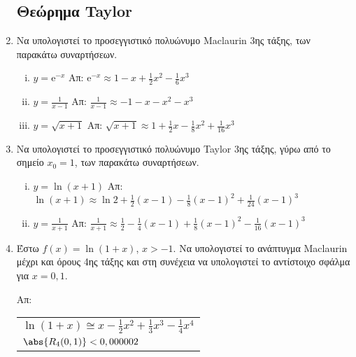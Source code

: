 \documentclass[a4paper,table]{report}
\begin{document}
\begin{enumerate}
      \subsection*{Θεώρημα Taylor}

    \item Να υπολογιστεί το προσεγγιστικό πολυώνυμο Maclaurin 3ης τάξης, των 
      παρακάτω συναρτήσεων.
      \begin{enumerate}[i)]
        \item $ y= \mathrm{e}^{-x} $ 
          \hfill Απ: $ \mathrm{e}^{-x} \approx 1-x+ \frac{1}{2} x^{2} - 
          \frac{1}{6} x^{3} $ 
        \item $ y= \frac{1}{x-1} $ \hfill Απ: $ \frac{1}{x-1} 
          \approx -1 -x -x^{2} - x^{3} $ 
        \item $ y= \sqrt{x+1} $ \hfill Απ: $ \sqrt{x+1} \approx 1 + \frac{1}{2} x -
          \frac{1}{8} x^{2} + \frac{1}{16} x^{3} $ 
      \end{enumerate}

    \item Να υπολογιστεί το προσεγγιστικό πολυώνυμο Taylor 3ης τάξης, γύρω από 
      το σημείο $ x_{0}=1 $, των παρακάτω συναρτήσεων.
      \begin{enumerate}[i)]
        \item $ y= \ln{(x+1)} $ 
          \hfill Απ: $ \ln{(x+1)} \approx \ln{2} + \frac{1}{2} (x-1) - \frac{1}{8}
          (x-1)^{2} + \frac{1}{24} (x-1)^{3} $ 
        \item $ y= \frac{1}{x+1} $ \hfill Απ: $ \frac{1}{x+1} \approx \frac{1}{2} -
          \frac{1}{4} (x-1) + \frac{1}{8} (x-1)^{2} - \frac{1}{16} (x-1)^{3} $ 
      \end{enumerate}

      \enlargethispage{1\baselineskip}

    \item Έστω $ f(x) = \ln{(1+x)} $, $ x>-1 $. Να υπολογιστεί το ανάπτυγμα
      Maclaurin μέχρι και όρους 4ης τάξης και στη συνέχεια να
      υπολογιστεί το αντίστοιχο σφάλμα για $ x = 0,1 $.

      \hfill Απ: \begin{tabular}{l}
        $ \ln(1+x) \cong x - \frac{1}{2} x^{2} + \frac{1}{3}x^{3} - 
        \frac{1}{4} x^{4} $ \\ 
        $ \abs{R_{4}(0,1)} < 0,000002$	
      \end{tabular}
  \end{enumerate}


  
\end{document}
